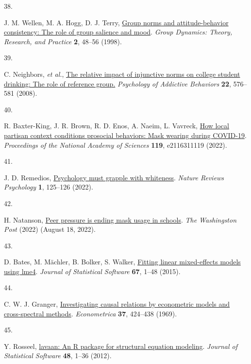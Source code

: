 \documentclass[
  man,floatsintext]{apa6}
\newlength{\cslhangindent}
\newlength{\csllabelwidth}
\newlength{\cslentryspacingunit} %
\newenvironment{CSLReferences}[2] %
 {%
  \setlength{\parindent}{0pt}
  \ifodd #1
  \let\oldpar\par
  \def\par{\hangindent=\cslhangindent\oldpar}
  \fi
  \setlength{\parskip}{#2\cslentryspacingunit}
 }%
 {}
\newcommand{\CSLLeftMargin}[1]{\parbox[t]{\csllabelwidth}{#1}}
\newcommand{\CSLRightInline}[1]{\parbox[t]{\linewidth - \csllabelwidth}{#1}\break}
\begin{document}
\begin{CSLReferences}{0}{0}
\leavevmode{}%
\CSLLeftMargin{38. }%
\CSLRightInline{J. M. Wellen, M. A. Hogg, D. J. Terry, \href{https://doi.org/10.1037/1089-2699.2.1.48}{Group norms and attitude-behavior consistency: The role of group salience and mood}. \emph{Group Dynamics: Theory, Research, and Practice} \textbf{2}, 48--56 (1998).}

\leavevmode{}%
\CSLLeftMargin{39. }%
\CSLRightInline{C. Neighbors, \emph{et al.}, \href{https://doi.org/10.1037/a0013043}{The relative impact of injunctive norms on college student drinking: The role of reference group.} \emph{Psychology of Addictive Behaviors} \textbf{22}, 576--581 (2008).}

\leavevmode{}%
\CSLLeftMargin{40. }%
\CSLRightInline{R. Baxter-King, J. R. Brown, R. D. Enos, A. Naeim, L. Vavreck, \href{https://doi.org/10.1073/pnas.2116311119}{How local partisan context conditions prosocial behaviors: Mask wearing during {COVID-19}}. \emph{Proceedings of the National Academy of Sciences} \textbf{119}, e2116311119 (2022).}

\leavevmode{}%
\CSLLeftMargin{41. }%
\CSLRightInline{J. D. Remedios, \href{https://doi.org/10.1038/s44159-022-00024-4}{Psychology must grapple with whiteness}. \emph{Nature Reviews Psychology} \textbf{1}, 125--126 (2022).}

\leavevmode{}%
\CSLLeftMargin{42. }%
\CSLRightInline{H. Natanson, \href{https://www.washingtonpost.com/education/2022/02/25/peer-pressure-mask-optional-schools/}{Peer pressure is ending mask usage in schools}. \emph{The Washingston Post} (2022) (August 18, 2022).}

\leavevmode{}%
\CSLLeftMargin{43. }%
\CSLRightInline{D. Bates, M. Mächler, B. Bolker, S. Walker, \href{https://doi.org/10.18637/jss.v067.i01}{Fitting linear mixed-effects models using lme4}. \emph{Journal of Statistical Software} \textbf{67}, 1--48 (2015).}

\leavevmode{}%
\CSLLeftMargin{44. }%
\CSLRightInline{C. W. J. Granger, \href{https://doi.org/10.2307/1912791}{Investigating causal relations by econometric models and cross-spectral methods}. \emph{Econometrica} \textbf{37}, 424--438 (1969).}

\leavevmode{}%
\CSLLeftMargin{45. }%
\CSLRightInline{Y. Rosseel, \href{https://doi.org/10.18637/jss.v048.i02}{{lavaan}: An {R} package for structural equation modeling}. \emph{Journal of Statistical Software} \textbf{48}, 1--36 (2012).}


\end{CSLReferences}
\end{document}
